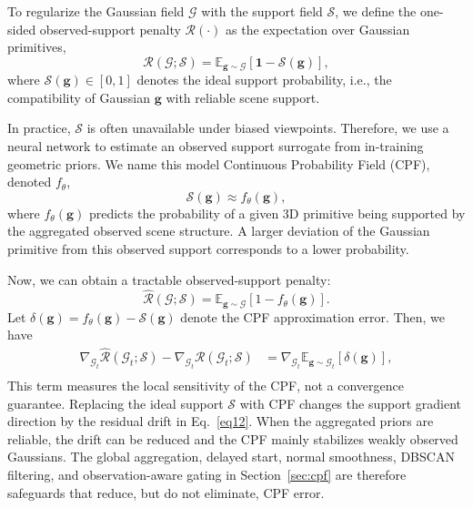 \documentclass[lettersize,journal]{IEEEtran}
\begin{document}
To regularize the Gaussian field $\mathcal{G}$ with the support field $\mathcal{S}$, we define the one-sided observed-support penalty $\mathcal{R}(\cdot)$ as the expectation over Gaussian primitives, 
\begin{equation}
    \mathcal{R}(\mathcal{G};\mathcal{S}) = \mathbb{E}_{\mathbf{g} \sim \mathcal{G}} \left[ \mathbf{1} - \mathcal{S} (\mathbf{g}) \right],
    \label{eq9}
\end{equation}
where $\mathcal{S} (\mathbf{g}) \in [0, 1]$ denotes the ideal support probability, i.e., the compatibility of Gaussian $\mathbf{g}$ with reliable scene support.

In practice, $\mathcal{S}$ is often unavailable under biased viewpoints. Therefore, we use a neural network to estimate an observed support surrogate from in-training geometric priors. We name this model Continuous Probability Field (CPF), denoted $f_{\theta}$, 
\begin{equation}
    \mathcal{S}(\mathbf{g}) \approx f_{\theta}(\mathbf{g}), 
    \label{eq10}
\end{equation}
where $f_{\theta}(\mathbf{g})$ predicts the probability of a given 3D primitive being supported by the aggregated observed scene structure. 
A larger deviation of the Gaussian primitive from this observed support corresponds to a lower probability.

Now, we can obtain a tractable observed-support penalty:
\begin{equation}
    \widehat{\mathcal{R}}(\mathcal{G};\mathcal{S}) = \mathbb{E}_{\mathbf{g} \sim \mathcal{G}} \left[ 1 - f_{\theta} (\mathbf{g}) \right].
    \label{eq11}
\end{equation}
Let $\delta(\mathbf{g})= f_{\theta} (\mathbf{g}) - \mathcal{S} (\mathbf{g})$ denote the CPF approximation error. Then, we have
\begin{equation}
    \begin{aligned}
    \nabla_{\mathcal{G}_t} \widehat{\mathcal{R}}(\mathcal{G}_t;\mathcal{S}) - \nabla_{\mathcal{G}_t} \mathcal{R}(\mathcal{G}_t;\mathcal{S}) &= \nabla_{\mathcal{G}_t} \mathbb{E}_{\mathbf{g} \sim \mathcal{G}_t} \left[ \delta(\mathbf{g}) \right], \\
    \end{aligned}
    \label{eq12}
\end{equation}
This term measures the local sensitivity of the CPF, not a convergence guarantee. Replacing the ideal support $\mathcal{S}$ with CPF changes the support gradient direction by the residual drift in Eq.~\ref{eq12}. When the aggregated priors are reliable, the drift can be reduced and the CPF mainly stabilizes weakly observed Gaussians. The global aggregation, delayed start, normal smoothness, DBSCAN filtering, and observation-aware gating in Section~\ref{sec:cpf} are therefore safeguards that reduce, but do not eliminate, CPF error.
\end{document}
